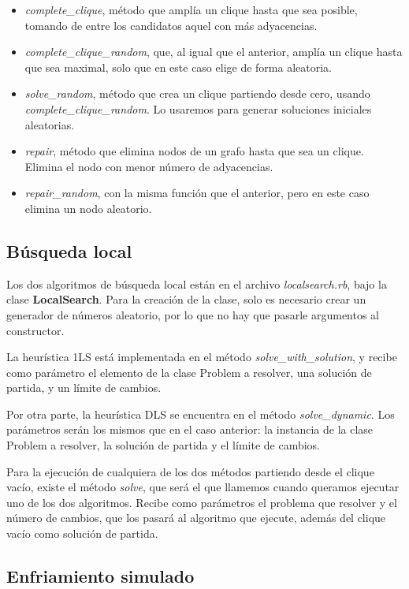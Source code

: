\begin{itemize}
  \item \textit{complete\_clique}, método que amplía un clique hasta que sea posible,
        tomando de entre los candidatos aquel con más adyacencias.
  \item \textit{complete\_clique\_random}, que, al igual que el anterior, amplía
        un clique hasta que sea maximal, solo que en este caso elige de forma aleatoria.
  \item \textit{solve\_random}, método que crea un clique partiendo desde cero, usando
        \textit{complete\_clique\_random}. Lo usaremos para generar soluciones iniciales
        aleatorias.
  \item \textit{repair}, método que elimina nodos de un grafo hasta que sea un clique.
        Elimina el nodo con menor número de adyacencias.
  \item \textit{repair\_random}, con la misma función que el anterior, pero en este
        caso elimina un nodo aleatorio.
\end{itemize}

\subsection{Búsqueda local}

Los dos algoritmos de búsqueda local están en el archivo \textit{localsearch.rb},
bajo la clase \textbf{LocalSearch}. Para la creación de la clase, solo es necesario
crear un generador de números aleatorio, por lo que no hay que pasarle argumentos
al constructor.

La heurística 1LS está implementada en el método \textit{solve\_with\_solution}, y
recibe como parámetro el elemento de la clase Problem a resolver, una solución
de partida, y un límite de cambios.

Por otra parte, la heurística DLS se encuentra en el método \textit{solve\_dynamic}.
Los parámetros serán los mismos que en el caso anterior: la instancia de la clase
Problem a resolver, la solución de partida y el límite de cambios.

Para la ejecución de cualquiera de los dos métodos partiendo desde el clique
vacío, existe el método \textit{solve}, que será el que llamemos cuando queramos
ejecutar uno de los dos algoritmos. Recibe como parámetros el problema que resolver
y el número de cambios, que los pasará al algoritmo que ejecute, además del clique
vacío como solución de partida.

\subsection{Enfriamiento simulado}

